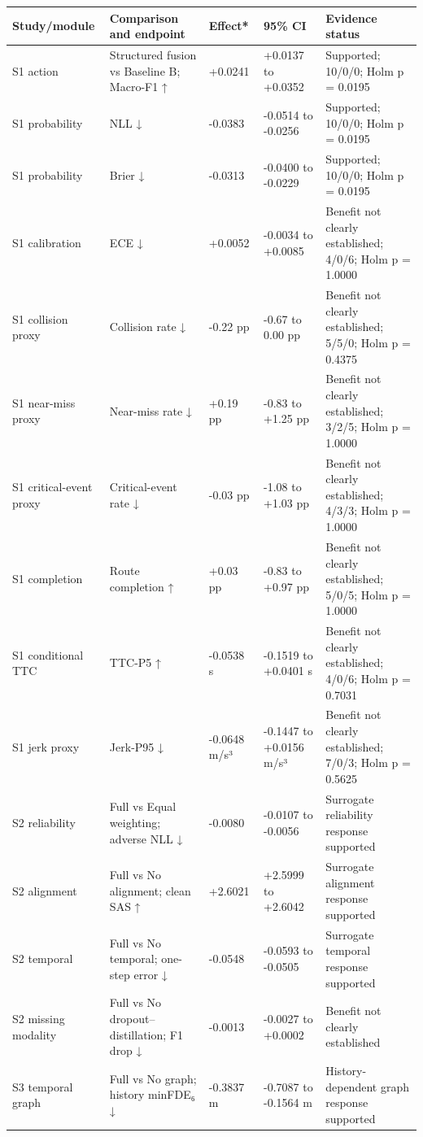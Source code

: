 \begin{tabular}{lllll}
\hline
Study/module & Comparison and endpoint & Effect* & 95\% CI & Evidence status \\
\hline
S1 action & Structured fusion vs Baseline B; Macro-F1 ↑ & +0.0241 & +0.0137 to +0.0352 & Supported; 10/0/0; Holm p = 0.0195 \\
S1 probability & NLL ↓ & -0.0383 & -0.0514 to -0.0256 & Supported; 10/0/0; Holm p = 0.0195 \\
S1 probability & Brier ↓ & -0.0313 & -0.0400 to -0.0229 & Supported; 10/0/0; Holm p = 0.0195 \\
S1 calibration & ECE ↓ & +0.0052 & -0.0034 to +0.0085 & Benefit not clearly established; 4/0/6; Holm p = 1.0000 \\
S1 collision proxy & Collision rate ↓ & -0.22 pp & -0.67 to 0.00 pp & Benefit not clearly established; 5/5/0; Holm p = 0.4375 \\
S1 near-miss proxy & Near-miss rate ↓ & +0.19 pp & -0.83 to +1.25 pp & Benefit not clearly established; 3/2/5; Holm p = 1.0000 \\
S1 critical-event proxy & Critical-event rate ↓ & -0.03 pp & -1.08 to +1.03 pp & Benefit not clearly established; 4/3/3; Holm p = 1.0000 \\
S1 completion & Route completion ↑ & +0.03 pp & -0.83 to +0.97 pp & Benefit not clearly established; 5/0/5; Holm p = 1.0000 \\
S1 conditional TTC & TTC-P5 ↑ & -0.0538 s & -0.1519 to +0.0401 s & Benefit not clearly established; 4/0/6; Holm p = 0.7031 \\
S1 jerk proxy & Jerk-P95 ↓ & -0.0648 m/s³ & -0.1447 to +0.0156 m/s³ & Benefit not clearly established; 7/0/3; Holm p = 0.5625 \\
S2 reliability & Full vs Equal weighting; adverse NLL ↓ & -0.0080 & -0.0107 to -0.0056 & Surrogate reliability response supported \\
S2 alignment & Full vs No alignment; clean SAS ↑ & +2.6021 & +2.5999 to +2.6042 & Surrogate alignment response supported \\
S2 temporal & Full vs No temporal; one-step error ↓ & -0.0548 & -0.0593 to -0.0505 & Surrogate temporal response supported \\
S2 missing modality & Full vs No dropout–distillation; F1 drop ↓ & -0.0013 & -0.0027 to +0.0002 & Benefit not clearly established \\
S3 temporal graph & Full vs No graph; history minFDE₆ ↓ & -0.3837 m & -0.7087 to -0.1564 m & History-dependent graph response supported \\

\end{tabular}
